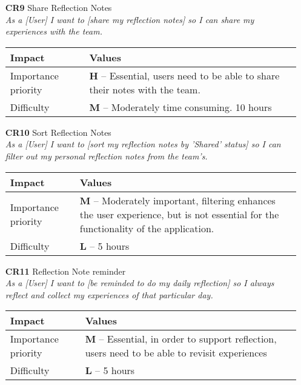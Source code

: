 \begin{itemize}
    \item[\textbf{CR9}] Share Reflection Notes\\
        \textit{\small{As a [User] I want to [share my reflection notes] so I can share my experiences with the team.}}

        \begin{tabular}{| l | p{8cm} |}
            \hline
            \rowcolor[gray]{0.8}
            \textbf{Impact} & \textbf{Values} \\
            \hline
            Importance priority & \textbf{H} -- Essential, users need to be able to share their notes with the team.\\
            Difficulty & \textbf{M} -- Moderately time consuming. 10 hours\\
            \hline
        \end{tabular}
    \vspace{0.5cm}

    \item[\textbf{CR10}] Sort Reflection Notes\\
        \textit{\small{As a [User] I want to [sort my reflection notes by 'Shared' status] so I can filter out my personal reflection notes from the team's.}}

        \begin{tabular}{| l | p{8cm} |}
            \hline
            \rowcolor[gray]{0.8}
            \textbf{Impact} & \textbf{Values} \\
            \hline
            Importance priority & \textbf{M} -- Moderately important, filtering enhances the user experience, but is not essential for the functionality of the application.\\
            Difficulty & \textbf{L} -- 5 hours\\
            \hline
        \end{tabular}
    \vspace{0.5cm}

    \item[\textbf{CR11}] Reflection Note reminder\\
        \textit{\small{As a [User] I want to [be reminded to do my daily reflection] so I always reflect and collect my experiences of that particular day.}}

        \begin{tabular}{| l | p{8cm} |}
            \hline
            \rowcolor[gray]{0.8}
            \textbf{Impact} & \textbf{Values} \\
            \hline
            Importance priority & \textbf{M} -- Essential, in order to support reflection, users need to be able to revisit experiences\\
            Difficulty & \textbf{L} -- 5 hours\\
            \hline
        \end{tabular}
    \vspace{0.5cm}


\end{itemize}
